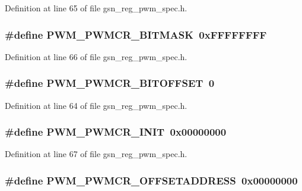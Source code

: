 Definition at line 65 of file gsn\_\-reg\_\-pwm\_\-spec.h.

\hypertarget{a00565_a940279f6cfb5c63c1d33ed7aef1af025}{
\subsubsection[{PWM\_\-PWMCR\_\-BITMASK}]{\setlength{\rightskip}{0pt plus 5cm}\#define PWM\_\-PWMCR\_\-BITMASK~0xFFFFFFFF}}
\label{a00565_a940279f6cfb5c63c1d33ed7aef1af025}


Definition at line 66 of file gsn\_\-reg\_\-pwm\_\-spec.h.

\hypertarget{a00565_aaff2da63915376887aab580f6fd14619}{
\subsubsection[{PWM\_\-PWMCR\_\-BITOFFSET}]{\setlength{\rightskip}{0pt plus 5cm}\#define PWM\_\-PWMCR\_\-BITOFFSET~0}}
\label{a00565_aaff2da63915376887aab580f6fd14619}


Definition at line 64 of file gsn\_\-reg\_\-pwm\_\-spec.h.

\hypertarget{a00565_a1b649e10a0e7c96070404a2f7e8e06fa}{
\subsubsection[{PWM\_\-PWMCR\_\-INIT}]{\setlength{\rightskip}{0pt plus 5cm}\#define PWM\_\-PWMCR\_\-INIT~0x00000000}}
\label{a00565_a1b649e10a0e7c96070404a2f7e8e06fa}


Definition at line 67 of file gsn\_\-reg\_\-pwm\_\-spec.h.

\hypertarget{a00565_a1ed6898b1ee03d9483ce781f1f851ffb}{
\subsubsection[{PWM\_\-PWMCR\_\-OFFSETADDRESS}]{\setlength{\rightskip}{0pt plus 5cm}\#define PWM\_\-PWMCR\_\-OFFSETADDRESS~0x00000000}}
\label{a00565_a1ed6898b1ee03d9483ce781f1f851ffb}


